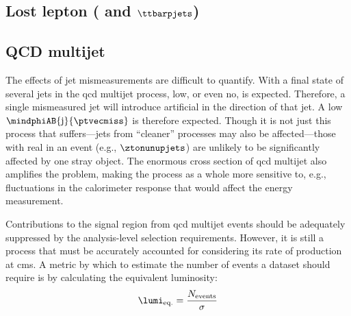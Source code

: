 \subsection{Lost lepton (\texorpdfstring{\PW}{W} and \texorpdfstring{$\ttbarpjets$}{ttbar plus jets})}
\label{subsec:htoinv_lost_lepton_bkg}




\subsection{\texorpdfstring{\ztonunupjets}{Z to nunu + jets}}
\label{subsec:htoinv_znunu_bkg}




\subsection{QCD multijet}
\label{subsec:htoinv_qcd_multijet_bkg}

The effects of \gls{jet} mismeasurements are difficult to quantify. With a final state of several \glspl{jet} in the \acrshort{qcd} multijet process, low, or even no, \ptvecmiss is expected. Therefore, a single mismeasured \gls{jet} will introduce artificial \ptvecmiss in the direction of that jet. A low $\mindphiAB{\mathrm{j}}{\ptvecmiss}$ is therefore expected. Though it is not just this process that suffers---\glspl{jet} from ``cleaner'' processes may also be affected---those with real \ptmiss in an event (e.g., $\ztonunupjets$) are unlikely to be significantly affected by one stray object. The enormous cross section of \acrshort{qcd} multijet also amplifies the problem, making the process as a whole more sensitive to, e.g., fluctuations in the calorimeter response that would affect the energy measurement.

Contributions to the signal region from \acrshort{qcd} multijet events should be adequately suppressed by the analysis-level selection requirements. However, it is still a process that must be accurately accounted for considering its rate of production at \acrshort{cms}. A metric by which to estimate the number of events a dataset should require is by calculating the equivalent luminosity:
\begin{equation}
    \lumi_{\mathrm{eq.}} = \frac{N_{\mathrm{events}}}{\sigma}
    \label{eq:equivalent_lumi}
\end{equation}

